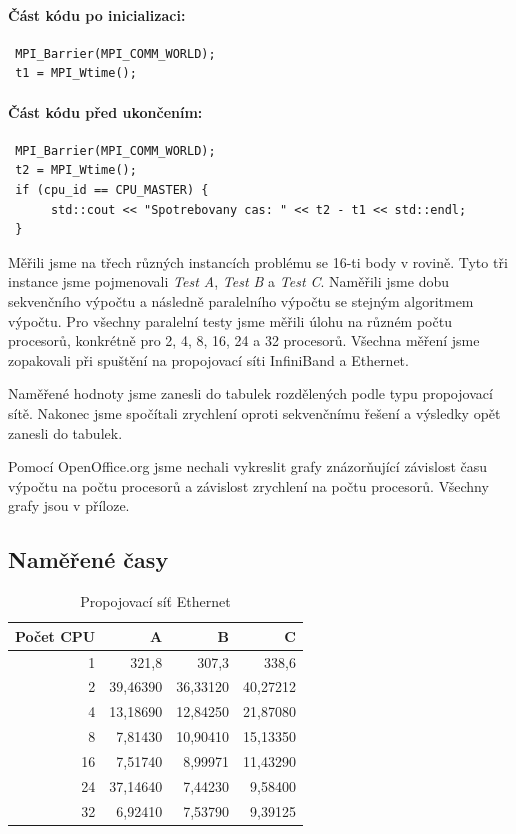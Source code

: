 \documentclass[12pt]{article}
\begin{document}
\paragraph{Část kódu po inicializaci:}
\begin{verbatim}
 MPI_Barrier(MPI_COMM_WORLD);
 t1 = MPI_Wtime();
\end{verbatim}
\paragraph{Část kódu před ukončením:}
\begin{verbatim}
 MPI_Barrier(MPI_COMM_WORLD);
 t2 = MPI_Wtime();
 if (cpu_id == CPU_MASTER) {
      std::cout << "Spotrebovany cas: " << t2 - t1 << std::endl;
 }
\end{verbatim}

Měřili jsme na třech různých instancích problému se 16-ti body v rovině. Tyto tři instance jsme
pojmenovali \emph{Test A}, \emph{Test B} a \emph{Test C}. Naměřili jsme dobu sekvenčního výpočtu
a následně paralelního výpočtu se stejným algoritmem výpočtu. Pro všechny paralelní testy jsme měřili úlohu na
různém počtu procesorů, konkrétně pro 2, 4, 8, 16, 24 a 32 procesorů. Všechna měření jsme zopakovali
při spuštění na propojovací síti InfiniBand a Ethernet.

Naměřené hodnoty jsme zanesli do tabulek rozdělených podle typu propojovací sítě. Nakonec jsme spočítali
zrychlení oproti sekvenčnímu řešení a výsledky opět zanesli do tabulek.

Pomocí OpenOffice.org jsme nechali vykreslit grafy znázorňující závislost času výpočtu na počtu procesorů
a závislost zrychlení na počtu procesorů. Všechny grafy jsou v příloze.
\subsection{Naměřené časy}
\begin{table}[H]
\begin{center}
\begin{tabular}{|r|r|r|r|}
\hline
Počet CPU & A & B & C\\
\hline
1 & 321,8 & 307,3 & 338,6\\
\hline
2 & 39,46390 & 36,33120 & 40,27212\\
\hline
4 & 13,18690 & 12,84250 & 21,87080\\
\hline
8 & 7,81430 & 10,90410 & 15,13350\\
\hline
16 & 7,51740 & 8,99971 & 11,43290\\
\hline
24 & 37,14640 & 7,44230 & 9,58400\\
\hline
32 & 6,92410 & 7,53790 & 9,39125\\
\hline
\end{tabular}
\end{center}
\caption{Propojovací síť Ethernet}
\end{table}
\end{document}
